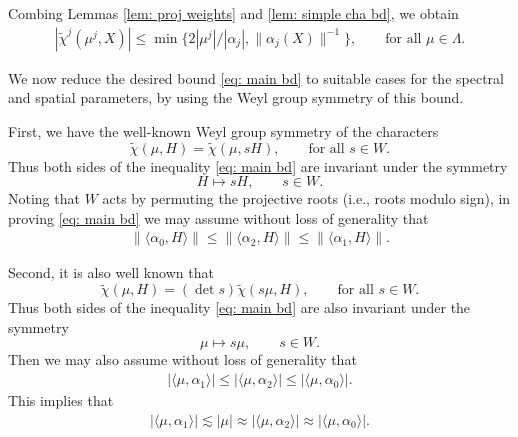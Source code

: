 \documentclass{amsart}
\numberwithin{equation}{section}
\numberwithin{equation}{section}
\begin{document}
Combing Lemmas \ref{lem: proj weights} and \ref{lem: simple cha bd}, we obtain 
\begin{align}\label{eq: rank one bd}
    |\widetilde{\chi}^j (\mu^j, X)|\leq  \min\{2|\mu^j|/|\alpha_j|,\|\alpha_j(X)\|^{-1}\}, \qquad\text{for all }\mu\in\Lambda.
\end{align}

We now reduce the desired bound \eqref{eq: main bd}  to suitable cases for the spectral and spatial parameters, by using the Weyl group symmetry of this bound. 

First, we have the well-known Weyl group symmetry of the characters $$\widetilde{\chi}(\mu,H)=\widetilde{\chi}(\mu,sH), \qquad \text{for all }s\in W.$$
Thus both sides of the inequality \eqref{eq: main bd} are invariant under the symmetry 
$$H\mapsto sH,\qquad s\in W.$$
Noting that $W$ acts by permuting the projective roots (i.e., roots modulo sign), 
in proving \eqref{eq: main bd} we may assume without loss of generality that 
\begin{align}\label{eq: assumption on H}
   \|\langle\alpha_0, H\rangle\|\leq \|\langle\alpha_2, H\rangle\|\leq \|\langle\alpha_1, H\rangle\|. 
\end{align}

Second, it is also well known that 
$$\widetilde{\chi}(\mu,H)=(\det s)\widetilde{\chi}(s\mu,H), \qquad \text{for all }s\in W.$$
Thus both sides of the inequality \eqref{eq: main bd} are also invariant under the symmetry 
$$\mu\mapsto s\mu,\qquad s\in W.$$
Then we may also assume without loss of generality that 
\begin{align}\label{eq: assumption on mu}
     | \langle\mu,\alpha_1\rangle|\leq  |\langle\mu,\alpha_2\rangle|\leq |\langle\mu,\alpha_0\rangle|.   
\end{align}
This implies that 
\begin{align}\label{eq: assumption on mu 2}
    | \langle\mu,\alpha_1\rangle|\lesssim |\mu|\approx |\langle\mu,\alpha_2\rangle|\approx |\langle\mu,\alpha_0\rangle|.
\end{align}
\end{document}
